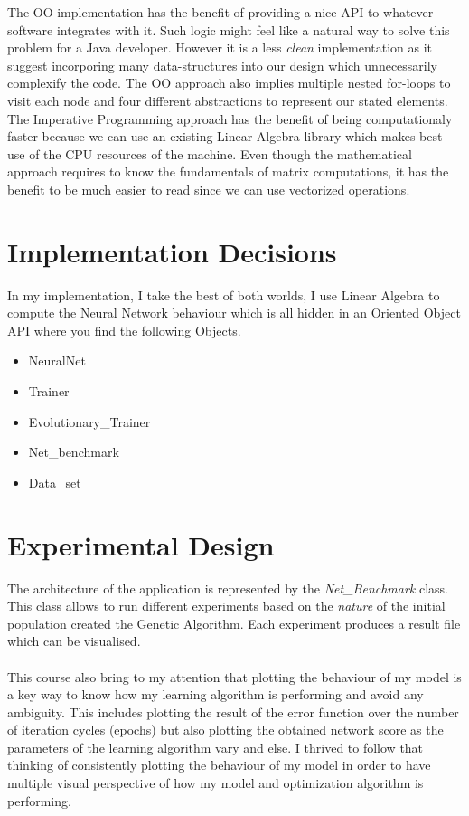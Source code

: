 \documentclass[a4paper,12pt, oneside]{memoir}
\begin{document}
The OO implementation has the benefit of providing a nice API to whatever software integrates with it. Such logic might feel like a natural way to solve this problem for a Java developer. However it is a less \textit{clean} implementation as it suggest incorporing many data-structures into our design which unnecessarily complexify the code. The OO approach also implies multiple nested for-loops to visit each node and four different abstractions to represent our stated elements. The Imperative Programming approach has the benefit of being computationaly faster because we can use an existing Linear Algebra library which makes best use of the CPU resources of the machine. Even though the mathematical approach requires to know the fundamentals of matrix computations, it has the benefit to be much easier to read since we can use vectorized operations. 

\section{Implementation Decisions}
In my implementation, I take the best of both worlds, I use Linear Algebra to compute the Neural Network behaviour which is all hidden in an Oriented Object API where you find the following Objects.

\begin{multicols}{3}
\begin{itemize}
  \setlength\itemsep{0.001em}
  \item NeuralNet
  \item Trainer 
  \item Evolutionary\_Trainer
  \item Net\_benchmark
  \item Data\_set
\end{itemize}
\end{multicols}


\section{Experimental Design}
The architecture of the application is represented by the \textit{Net\_Benchmark} class. This class allows to run different experiments based on the \textit{nature} of the initial population created the Genetic Algorithm. Each experiment produces a result file which can be visualised.
\\
\\
This course \cite{coursera-machine-learning-stanford} also bring to my attention that plotting the behaviour of my model is a key way to know how my learning algorithm is performing and avoid any ambiguity. This includes plotting the result of the error function over the number of iteration cycles (epochs) but also plotting the obtained network score as the parameters of the learning algorithm vary and else. I thrived to follow that thinking of consistently plotting the behaviour of my model in order to have multiple visual perspective of how my model and optimization algorithm is performing.
\end{document}
